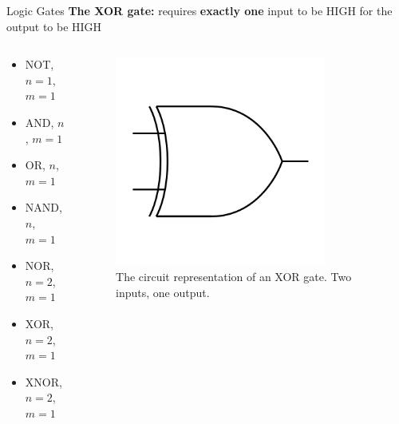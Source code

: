 \documentclass{beamer}
\begin{document}
\begin{frame}{Logic Gates}
\textbf{The XOR gate:} requires \textbf{exactly one} input to be HIGH for the output to be HIGH \\ \vspace{0.5cm}
\begin{columns}[T]
\begin{column}{0.5\textwidth}
\begin{itemize}
\item \alert{NOT, $n=1$, $m=1$}
\item \alert{AND, $n$, $m=1$}
\item \alert{OR, $n$, $m=1$}
\item \alert{NAND, $n$, $m=1$}
\item \alert{NOR, $n=2$, $m=1$}
\item \alert{XOR, $n=2$, $m=1$}
\item XNOR, $n=2$, $m=1$
\end{itemize}
\end{column}
\begin{column}{0.5\textwidth}
\begin{figure}
\centering
\includegraphics[width=0.8\textwidth,trim=0cm 2cm 0cm 2cm,clip=true]{figures/BasicXOR.pdf}
\caption{\label{fig:xor} The circuit representation of an XOR gate.  Two inputs, one output.}
\end{figure}
\end{column}
\end{columns}
\end{frame}
\end{document}

